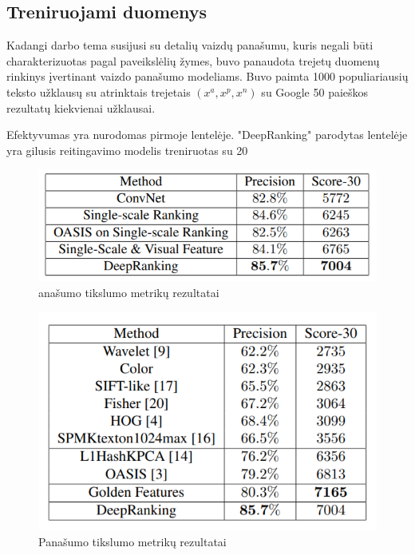 \documentclass{VUMIFPSkursinis}
\begin{document}
\subsection{Treniruojami duomenys}
Kadangi darbo tema susijusi su detalių vaizdų panašumu, kuris negali būti charakterizuotas pagal paveikslėlių žymes, buvo panaudota trejetų duomenų rinkinys įvertinant vaizdo panašumo modeliams.
Buvo paimta 1000 populiariausių teksto užklausų su atrinktais trejetais $(x^a, x^p, x^n)$ su Google 50 paieškos rezultatų kiekvienai užklausai.

Efektyvumas yra nurodomas pirmoje lentelėje. "DeepRanking" parodytas lentelėje yra gilusis reitingavimo modelis treniruotas su 20%
\begin{figure}[H]
\centering
\includegraphics[scale=0.7]{img/Similarity_precision_diff_CNN}
\caption{anašumo tikslumo metrikų rezultatai} %
\label{img:mlp}
\end{figure}

\begin{figure}[H]
\centering
\includegraphics[scale=0.7]{img/Similarity_precision}
\caption{Panašumo tikslumo metrikų rezultatai} %
\label{img:mlp}
\end{figure}
\pagebreak
\end{document}
